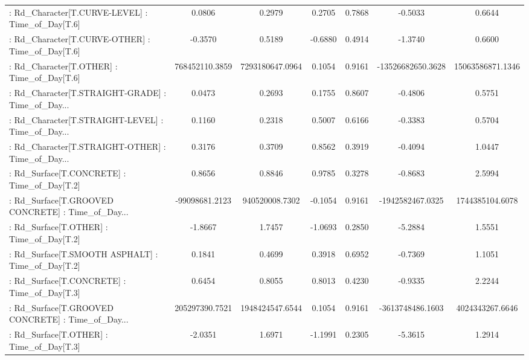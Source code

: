 \begin{longtable}{p{4cm}cccccc}
 : Rd\_Character[T.CURVE-LEVEL] : Time\_of\_Day[T.6]  &            0.0806 &            0.2979 &  0.2705 &       0.7868 &            -0.5033 &            0.6644 \\
 : Rd\_Character[T.CURVE-OTHER] : Time\_of\_Day[T.6]  &           -0.3570 &            0.5189 & -0.6880 &       0.4914 &            -1.3740 &            0.6600 \\
 : Rd\_Character[T.OTHER] : Time\_of\_Day[T.6]        &    768452110.3859 &   7293180647.0964 &  0.1054 &       0.9161 &  -13526682650.3628 &  15063586871.1346 \\
 : Rd\_Character[T.STRAIGHT-GRADE] : Time\_of\_Day... &            0.0473 &            0.2693 &  0.1755 &       0.8607 &            -0.4806 &            0.5751 \\
 : Rd\_Character[T.STRAIGHT-LEVEL] : Time\_of\_Day... &            0.1160 &            0.2318 &  0.5007 &       0.6166 &            -0.3383 &            0.5704 \\
 : Rd\_Character[T.STRAIGHT-OTHER] : Time\_of\_Day... &            0.3176 &            0.3709 &  0.8562 &       0.3919 &            -0.4094 &            1.0447 \\
 : Rd\_Surface[T.CONCRETE] : Time\_of\_Day[T.2]       &            0.8656 &            0.8846 &  0.9785 &       0.3278 &            -0.8683 &            2.5994 \\
 : Rd\_Surface[T.GROOVED CONCRETE] : Time\_of\_Day... &    -99098681.2123 &    940520008.7302 & -0.1054 &       0.9161 &   -1942582467.0325 &   1744385104.6078 \\
 : Rd\_Surface[T.OTHER] : Time\_of\_Day[T.2]          &           -1.8667 &            1.7457 & -1.0693 &       0.2850 &            -5.2884 &            1.5551 \\
 : Rd\_Surface[T.SMOOTH ASPHALT] : Time\_of\_Day[T.2] &            0.1841 &            0.4699 &  0.3918 &       0.6952 &            -0.7369 &            1.1051 \\
 : Rd\_Surface[T.CONCRETE] : Time\_of\_Day[T.3]       &            0.6454 &            0.8055 &  0.8013 &       0.4230 &            -0.9335 &            2.2244 \\
 : Rd\_Surface[T.GROOVED CONCRETE] : Time\_of\_Day... &    205297390.7521 &   1948424547.6544 &  0.1054 &       0.9161 &   -3613748486.1603 &   4024343267.6646 \\
 : Rd\_Surface[T.OTHER] : Time\_of\_Day[T.3]          &           -2.0351 &            1.6971 & -1.1991 &       0.2305 &            -5.3615 &            1.2914 \\

\end{longtable}
